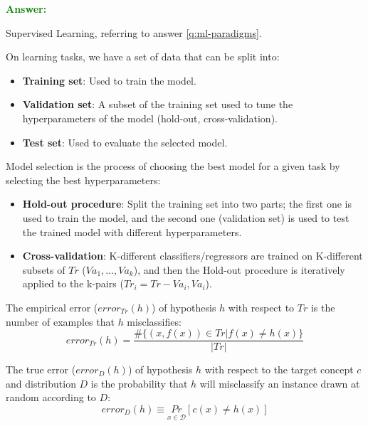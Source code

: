 \documentclass[12pt]{article}
\begin{document}
\begin{enumerate}[label=\textbf{ML.\arabic*}]
          \textcolor{green}{\textbf{Answer:}}

          Supervised Learning, referring to answer \ref{q:ml-paradigms}.

          On learning tasks, we have a set of data that can be split into:
          \begin{itemize}
              \item \textbf{Training set}: Used to train the model.
              \item \textbf{Validation set}: A subset of the training set used to tune the hyperparameters of the model (hold-out, cross-validation).
              \item \textbf{Test set}: Used to evaluate the selected model.
          \end{itemize}

          Model selection is the process of choosing the best model for a given task by selecting the best hyperparameters:
          \begin{itemize}
              \item \textbf{Hold-out procedure}: Split the training set into two parts; the first one is used to train the model, and the second one (validation set) is used to test the trained model with different hyperparameters.
              \item \textbf{Cross-validation}: K-different classifiers/regressors are trained on K-different subsets of $Tr$ ($Va_1,\ldots,Va_k$), and then the Hold-out procedure is iteratively applied to the k-pairs ($Tr_i=Tr-Va_i,Va_i$).
          \end{itemize}

          The empirical error ($error_{Tr}(h)$) of hypothesis $h$ with respect to $Tr$ is the number of examples that $h$ misclassifies:
          \begin{equation}\label{eq:empirical_error}
              error_{Tr}(h) = \frac{\# \{(x,f(x)) \in Tr|f(x)\neq h(x)\}}{|Tr|}
          \end{equation}

          The true error ($error_D(h)$) of hypothesis $h$ with respect to the target concept $c$ and distribution $D$ is the probability that $h$ will misclassify an instance drawn at random according to $D$:
          \begin{equation}\label{eq:true_error}
              error_D(h) \equiv \underset{x\in\mathcal{D}}{Pr}[c(x)\neq h(x)]
          \end{equation}


\end{enumerate}
\end{document}
